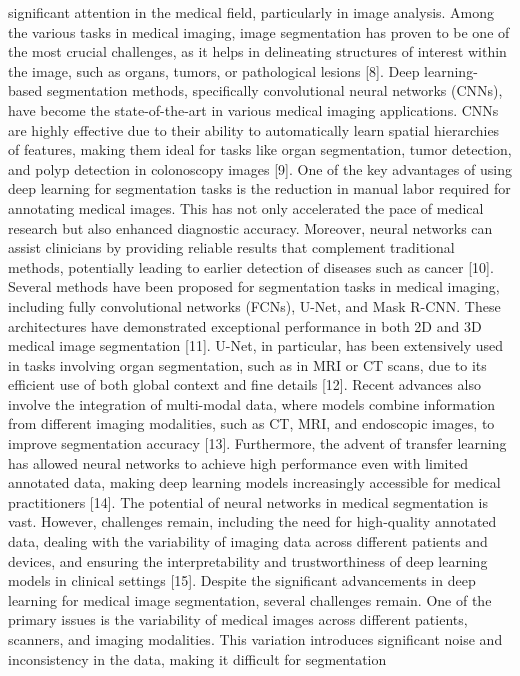 significant attention in the medical field, particularly in image analysis. Among the various
tasks in medical imaging, image segmentation has proven to be one of the most crucial
challenges, as it helps in delineating structures of interest within the image, such as organs,
tumors, or pathological lesions [8].
Deep learning-based segmentation methods, specifically convolutional neural networks (CNNs), have become the state-of-the-art in various medical imaging applications.
CNNs are highly effective due to their ability to automatically learn spatial hierarchies of
features, making them ideal for tasks like organ segmentation, tumor detection, and polyp
detection in colonoscopy images [9].
One of the key advantages of using deep learning for segmentation tasks is the
reduction in manual labor required for annotating medical images. This has not only
accelerated the pace of medical research but also enhanced diagnostic accuracy. Moreover, neural networks can assist clinicians by providing reliable results that complement
traditional methods, potentially leading to earlier detection of diseases such as cancer [10].
Several methods have been proposed for segmentation tasks in medical imaging,
including fully convolutional networks (FCNs), U-Net, and Mask R-CNN. These architectures have demonstrated exceptional performance in both 2D and 3D medical image
segmentation [11]. U-Net, in particular, has been extensively used in tasks involving organ
segmentation, such as in MRI or CT scans, due to its efficient use of both global context
and fine details [12].
Recent advances also involve the integration of multi-modal data, where models
combine information from different imaging modalities, such as CT, MRI, and endoscopic
images, to improve segmentation accuracy [13]. Furthermore, the advent of transfer learning has allowed neural networks to achieve high performance even with limited annotated
data, making deep learning models increasingly accessible for medical practitioners [14].
The potential of neural networks in medical segmentation is vast. However, challenges remain, including the need for high-quality annotated data, dealing with the variability of imaging data across different patients and devices, and ensuring the interpretability
and trustworthiness of deep learning models in clinical settings [15].
Despite the significant advancements in deep learning for medical image segmentation, several challenges remain. One of the primary issues is the variability of medical
images across different patients, scanners, and imaging modalities. This variation introduces significant noise and inconsistency in the data, making it difficult for segmentation
